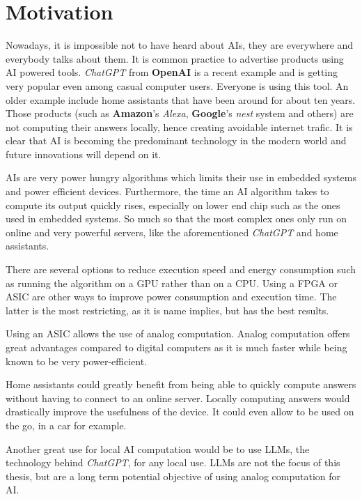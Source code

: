 \section{Motivation}
\label{sec:motivation}

Nowadays, it is impossible not to have heard about \acp{AI}, they are everywhere and everybody talks about them. It is common practice to advertise products using \ac{AI} powered tools. \textit{ChatGPT} from \textbf{OpenAI} is a recent example and is getting very popular even among casual computer users. Everyone is using this tool. An older example include home assistants that have been around for about ten years. Those products (such as \textbf{Amazon}'s \textit{Alexa}, \textbf{Google}'s \textit{nest} system and others) are not computing their answers locally, hence creating avoidable internet trafic. It is clear that \ac{AI} is becoming the predominant technology in the modern world and future innovations will depend on it.

\acp{AI} are very power hungry algorithms which limits their use in embedded systems and power efficient devices.
Furthermore, the time an \ac{AI} algorithm takes to compute its output quickly rises, especially on lower end chip such as the ones used in embedded systems. So much so that the most complex ones only run on online and very powerful servers, like the aforementioned \textit{ChatGPT} and home assistants.

There are several options to reduce execution speed and energy consumption such as running the algorithm on a \ac{GPU} rather than on a \ac{CPU}. Using a \ac{FPGA} or \ac{ASIC} are other ways to improve power consumption and execution time.
The latter is the most restricting, as it is name implies, but has the best results.

Using an \ac{ASIC} allows the use of analog computation. Analog computation offers great advantages compared to digital computers as it is much faster while being known to be very power-efficient.

Home assistants could greatly benefit from being able to quickly compute answers without having to connect to an online server. Locally computing answers would drastically improve the usefulness of the device. It could even allow to be used on the go, in a car for example.

Another great use for local \ac{AI} computation would be to use \acp{LLM}, the technology behind \textit{ChatGPT}, for any local use. \acp{LLM} are not the focus of this thesis, but are a long term potential objective of using analog computation for \ac{AI}.

